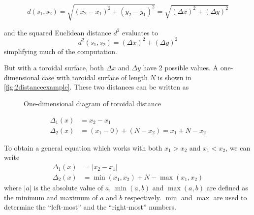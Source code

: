 \documentclass[a4paper]{article}
\begin{document}
\begin{equation}
    \label{eq:euclid}
    d(s_1,s_2)=\sqrt{(x_2-x_1)^2+(y_2-y_1)^2}=\sqrt{(\Delta x)^2+(\Delta y)^2}
\end{equation}

and the squared Euclidean distance $d^2$ evaluates to
\begin{equation}
    d^2(s_1,s_2)=(\Delta x)^2+(\Delta y)^2
    \label{eq:squaredEuclid}
\end{equation}
simplifying much of the computation.

But with a toroidal surface, both $\Delta x$ and $\Delta y$ have 2 possible values. A one-dimensional case with toroidal surface of length $N$ is shown in \autoref{fig:2distanceexample}. These two distances can be written as

\begin{figure}[htpb]
    \centering
    \caption{One-dimensional diagram of toroidal distance}%
    \label{fig:2distanceexample}
\end{figure}


\begin{align*}
    \Delta_1(x)&=x_2-x_1 \\
    \Delta_2(x)&=(x_1-0)+(N-x_2)=x_1+N-x_2
\end{align*}

To obtain a general equation which works with both $x_1>x_2$ and $x_1<x_2$, we can write
\begin{align*}
    \Delta_1(x)&=\lvert x_2-x_1 \rvert \\
    \Delta_2(x)&=\min{(x_1,x_2)}+N-\max{(x_1,x_2)}
\end{align*}
where $ \lvert a\rvert$ is the absolute value of $a$, $\min{(a,b)}$ and $\max{(a,b)}$ are defined as the minimum and maximum of $a$ and $b$ respectively. $\min$ and $\max$ are used to determine the  ``left-most'' and the ``right-most'' numbers.
\end{document}
